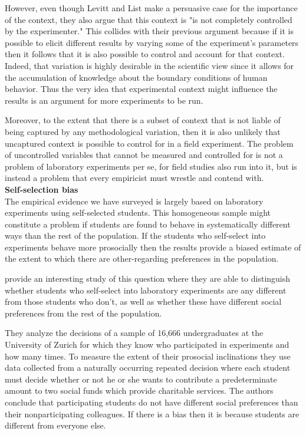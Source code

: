 \documentclass[12pt]{article}
\begin{document}
However, even though Levitt and List make a persuasive case for the importance of the context, they also argue that this context is "is not completely controlled by the experimenter." This collides with their previous argument because if it is possible to elicit different results by varying some of the experiment's parameters then it follows that it is also possible to control and account for that context. Indeed, that variation is highly desirable in the scientific view since it allows for the accumulation of knowledge about the boundary conditions of human behavior. Thus the very idea that experimental context might influence the results is an argument for more experiments to be run.

Moreover, to the extent that there is a subset of context that is not liable of being captured by any methodological variation, then it is also unlikely that uncaptured context is possible to control for in a field experiment. The problem of uncontrolled variables that cannot be measured and controlled for is not a problem of laboratory experiments per se, for field studies also run into it, but is instead a problem that every empiricist must wrestle and contend with. 
\\

\textbf{Self-selection bias}
\\

The empirical evidence we have surveyed is largely based on laboratory experiments using self-selected students. This homogeneous sample might constitute a problem if students are found to behave in systematically different ways than the rest of the population. If the students who self-select into experiments behave more prosocially then the results provide a biased estimate of the extent to which there are other-regarding preferences in the population.

\cite{falk2013lab} provide an interesting study of this question where they are able to distinguish whether students who self-select into laboratory experiments are any different from those students who don't, as well as whether these have different social preferences from the rest of the population. 

They analyze the decisions of a sample of 16,666 undergraduates at the University of Zurich for which they know who participated in experiments and how many times. To measure the extent of their prosocial inclinations they use data collected from a naturally occurring repeated decision where each student must decide whether or not he or she wants to contribute a predeterminate amount to two social funds which provide charitable services. The authors conclude that participating students do not have different social preferences than their nonparticipating colleagues. If there is a bias then it is because students are different from everyone else.
\end{document}

